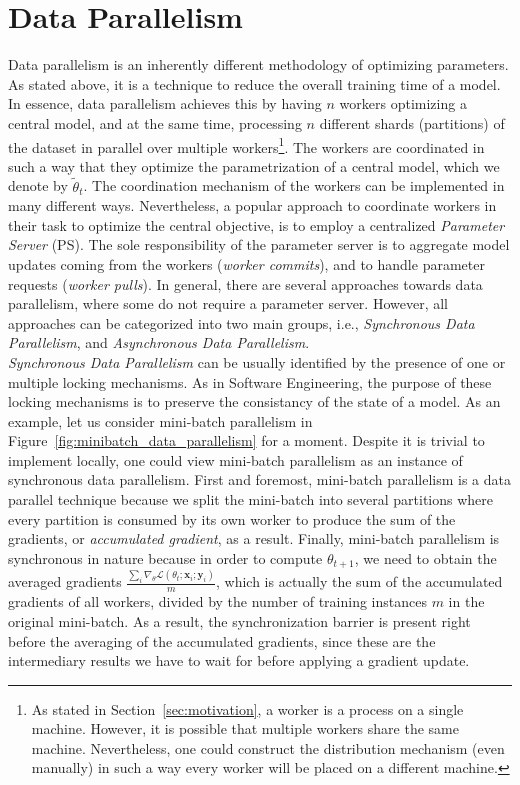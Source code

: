 \section{Data Parallelism}
\label{sec:intro_data_parallelism}

Data parallelism is an inherently different methodology of optimizing parameters. As stated above, it is a technique to reduce the overall training time of a model. In essence, data parallelism achieves this by having $n$ workers optimizing a central model, and at the same time, processing $n$ different shards (partitions) of the dataset in parallel over multiple workers\footnote{As stated in Section~\ref{sec:motivation}, a worker is a process on a single machine. However, it is possible that multiple workers share the same machine. Nevertheless, one could construct the distribution mechanism (even manually) in such a way every worker will be placed on a different machine.}. The workers are coordinated in such a way that they optimize the parametrization of a central model, which we denote by $\tilde{\theta}_t$. The coordination mechanism of the workers can be implemented in many different ways. Nevertheless, a popular approach to coordinate workers in their task to optimize the central objective, is to employ a centralized \emph{Parameter Server} (PS). The sole responsibility of the parameter server is to aggregate model updates coming from the workers (\emph{worker commits}), and to handle parameter requests (\emph{worker pulls}). In general, there are several approaches towards data parallelism, where some do not require a parameter server. However, all approaches can be categorized into two main groups, i.e., \emph{Synchronous Data Parallelism}, and \emph{Asynchronous Data Parallelism}.\\

\emph{Synchronous Data Parallelism} can be usually identified by the presence of one or multiple locking mechanisms. As in Software Engineering, the purpose of these locking mechanisms is to preserve the consistancy of the state of a model. As an example, let us consider mini-batch parallelism in Figure~\ref{fig:minibatch_data_parallelism} for a moment. Despite it is trivial to implement locally, one could view mini-batch parallelism as an instance of synchronous data parallelism. First and foremost, mini-batch parallelism is a data parallel technique because we split the mini-batch into several partitions where every partition is consumed by its own worker to produce the sum of the gradients, or \emph{accumulated gradient}, as a result. Finally, mini-batch parallelism is synchronous in nature because in order to compute $\theta_{t+1}$, we need to obtain the averaged gradients $\frac{\sum_i \nabla_\theta \mathcal{L}(\theta_t;\textbf{x}_i;\textbf{y}_i)}{m}$, which is actually the sum of the accumulated gradients of all workers, divided by the number of training instances $m$ in the original mini-batch. As a result, the synchronization barrier is present right before the averaging of the accumulated gradients, since these are the intermediary results we have to wait for before applying a gradient update.

